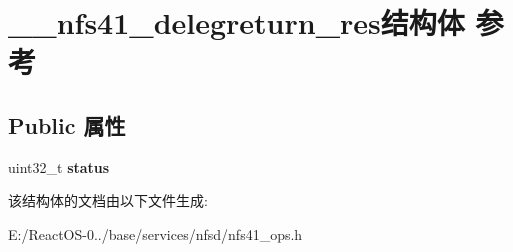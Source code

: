 \hypertarget{struct____nfs41__delegreturn__res}{}\section{\+\_\+\+\_\+nfs41\+\_\+delegreturn\+\_\+res结构体 参考}
\label{struct____nfs41__delegreturn__res}
\subsection*{Public 属性}
\begin{DoxyCompactItemize}
\item 
\mbox{\label{struct____nfs41__delegreturn__res_a2d82e14715af9cf779960562fdc19740}} 
uint32\+\_\+t {\bfseries status}
\end{DoxyCompactItemize}


该结构体的文档由以下文件生成\+:\begin{DoxyCompactItemize}
\item 
E\+:/\+React\+O\+S-\/0../base/services/nfsd/nfs41\+\_\+ops.\+h\end{DoxyCompactItemize}
